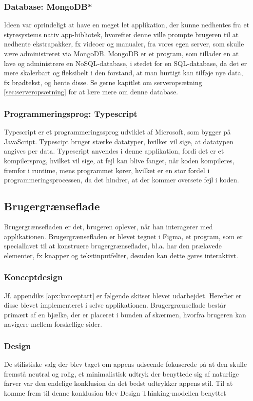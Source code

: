 \subsubsection{Database: MongoDB* \label{sec:mongodb}}
Ideen var oprindeligt at have en meget let applikation, der kunne nedhentes fra et styresystems nativ app-bibliotek, hvorefter denne ville prompte brugeren til at nedhente ekstrapakker, fx videoer og manualer, fra vores egen server, som skulle være administreret via MongoDB. MongoDB er et program, som tillader en at lave og administrere en NoSQL-database, i stedet for en SQL-database, da det er mere skalerbart og fleksibelt i den forstand, at man hurtigt kan tilføje nye data, fx brødtekst, og hente disse. Se gerne kapitlet om serveropsætning \ref{sec:serveropsætning} for at lære mere om denne database.
\subsubsection{Programmeringsprog: Typescript}
Typescript er et programmeringssprog udviklet af Microsoft, som bygger på JavaScript. Typescipt bruger stærke datatyper, hvilket vil sige, at datatypen angives per data. Typescript anvendes i denne applikation, fordi det er et kompilersprog, hvilket vil sige, at fejl kan blive fanget, når koden kompileres, fremfor i runtime, mens programmet kører, hvilket er en stor fordel i programmeringsprocessen, da det hindrer, at der kommer oversete fejl i koden.
\subsection{Brugergrænseflade}
Brugergrænsefladen er det, brugeren oplever, når han interagerer med applikationen. Brugergrænsefladen er blevet tegnet i Figma, et program, som er speciallavet til at konstruere brugergrænseflader, bl.a. har den prælavede elementer, fx knapper og tekstinputfelter, desuden kan dette gøres interaktivt. 
\subsubsection{Konceptdesign}
Jf. appendiks \ref{apx:konceptart} er følgende skitser blevet udarbejdet. Herefter er disse blevet implementeret i selve applikationen. Brugergrænseflade består primært af en bjælke, der er placeret i bunden af skærmen, hvorfra brugeren kan navigere mellem forskellige sider.
\subsubsection{Design \label{sec:design}}
De stilistiske valg der blev taget om appens udseende fokuserede på at den skulle fremstå neutral og rolig, et minimalistisk udtryk der benyttede sig af naturlige farver var den endelige konklusion da det bedst udtrykker appens stil. Til at komme frem til denne konklusion blev Design Thinking-modellen benyttet \cite{Design-grundbog}

